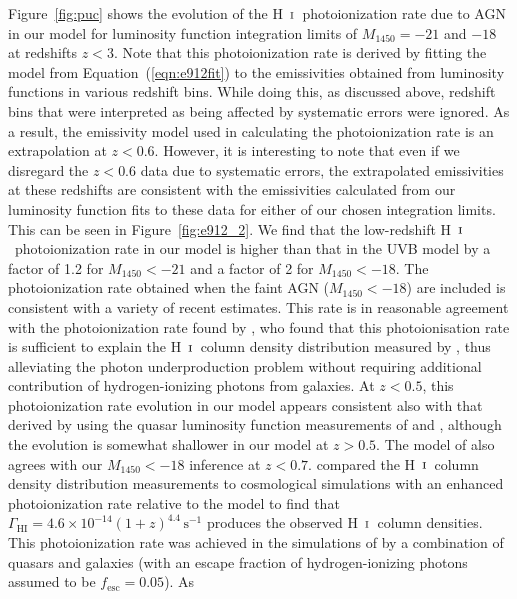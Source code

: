 \documentclass[fleqn,usenatbib]{mnras}
\def\HI{\hbox{H~$\scriptstyle\rm I$}}
\begin{document}
Figure~\ref{fig:puc} shows the evolution of the \HI\ photoionization
rate due to AGN in our model for luminosity function integration
limits of $M_{1450}=-21$ and $-18$ at redshifts $z<3$.  Note that this
photoionization rate is derived by fitting the model from
Equation~(\ref{eqn:e912fit}) to the emissivities obtained from
luminosity functions in various redshift bins.  While doing this, as
discussed above, redshift bins that were interpreted as being affected
by systematic errors were ignored.  As a result, the emissivity model
used in calculating the photoionization rate is an extrapolation at
$z<0.6$.  However, it is interesting to note that even if we disregard
the $z<0.6$ data due to systematic errors, the extrapolated
emissivities at these redshifts are consistent with the emissivities
calculated from our luminosity function fits to these data for either
of our chosen integration limits.  This can be seen in
Figure~\ref{fig:e912_2}.  We find that the low-redshift
\HI\ photoionization rate in our model is higher than that in the
\citet{2012ApJ...746..125H} UVB model by a factor of 1.2 for
$M_{1450}<-21$ and a factor of 2 for $M_{1450}<-18$.  The
photoionization rate obtained when the faint AGN ($M_{1450}<-18$) are
included is consistent with a variety of recent estimates.  This rate
is in reasonable agreement with the photoionization rate found by
\citet{2017MNRAS.467.3172G}, who found that this photoionisation rate
is sufficient to explain the \HI\ column density distribution measured
by \citet{2016ApJ...817..111D}, thus alleviating the photon
underproduction problem without requiring additional contribution of
hydrogen-ionizing photons from galaxies.  At $z<0.5$, this
photoionization rate evolution in our model appears consistent also
with that derived by \citet{2015MNRAS.451L..30K} using the quasar
luminosity function measurements of \citet{2009MNRAS.392...19C} and
\citet{2013A&A...551A..29P}, although the evolution is somewhat
shallower in our model at $z>0.5$.  The model of
\citet{2015ApJ...813L...8M} also agrees with our $M_{1450}<-18$
inference at $z<0.7$.  \citet{2015ApJ...811....3S} compared the
\HI\ column density distribution measurements to cosmological
simulations with an enhanced photoionization rate relative to the
\citet{2012ApJ...746..125H} model to find that
$\Gamma_\mathrm{HI}=4.6\times 10^{-14}(1+z)^{4.4}\,\mathrm{s}^{-1}$
produces the observed \HI\ column densities.  This photoionization
rate was achieved in the simulations of \citet{2015ApJ...811....3S} by
a combination of quasars and galaxies (with an escape fraction of
hydrogen-ionizing photons assumed to be $f_\mathrm{esc}=0.05$).  As
\end{document}
